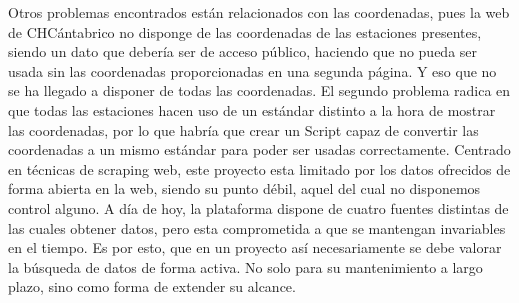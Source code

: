 \newline
Otros problemas encontrados están relacionados con las coordenadas, pues la web de CHCántabrico no disponge de las coordenadas de las estaciones presentes, siendo un dato que debería ser de acceso público, haciendo que no pueda ser usada sin las coordenadas proporcionadas en una segunda página. Y eso que no se ha llegado a disponer de todas las coordenadas. El segundo problema radica en que todas las estaciones hacen uso de un estándar distinto a la hora de mostrar las coordenadas, por lo que habría que crear un Script capaz de convertir las coordenadas a un mismo estándar para poder ser usadas correctamente.\newline
\newline
Centrado en técnicas de scraping web, este proyecto esta limitado por los datos ofrecidos de forma abierta en la web, siendo su punto débil, aquel del cual no disponemos control alguno. A día de hoy, la plataforma dispone de cuatro fuentes distintas de las cuales obtener datos, pero esta comprometida a que se mantengan invariables en el tiempo. Es por esto, que en un proyecto así necesariamente se debe valorar la búsqueda de datos de forma activa. No solo para su mantenimiento a largo plazo, sino como forma de extender su alcance.\newline
\newline